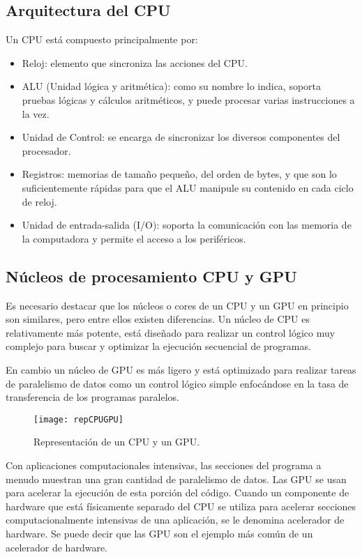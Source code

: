      \subsection{Arquitectura del CPU}

Un CPU está compuesto principalmente por:
\begin{itemize}
\item Reloj: elemento que sincroniza las acciones del CPU.
\item ALU (Unidad lógica y aritmética): como su nombre lo indica, soporta pruebas lógicas y cálculos aritméticos, y puede procesar varias instrucciones a la vez.
\item Unidad de Control: se encarga de sincronizar los diversos componentes del procesador.
\item Registros: memorias de tamaño pequeño, del orden de bytes, y que son lo suficientemente rápidas para que el ALU manipule su contenido en cada ciclo de reloj.
\item Unidad de entrada-salida (I/O): soporta la comunicación con las memoria de la computadora y permite el acceso a los periféricos.
\end{itemize}   

\subsection{Núcleos de procesamiento CPU y GPU}
    Es necesario destacar que los núcleos o cores de un CPU y un GPU en principio son similares, pero entre ellos existen diferencias. Un núcleo de CPU es relativamente más potente, está diseñado para realizar un control lógico muy complejo para buscar y optimizar la ejecución secuencial de programas.
\newline
    
    En cambio un núcleo de GPU es más ligero y está optimizado para realizar tareas de paralelismo de datos como un control lógico simple enfocándose en la tasa de transferencia de los programas paralelos.
 \newline
 
        \begin{figure}[ht]
      \centering
        \texttt{[image: repCPUGPU]}
        \caption{Representación de un CPU y un GPU\cite{NCUDA}.}
        \label{fig:repgpgpu}
    \end{figure}

    Con aplicaciones computacionales intensivas, las secciones del programa a menudo muestran una gran cantidad de paralelismo de datos. Las GPU se usan para acelerar la ejecución de esta porción del código. Cuando un componente de hardware que está físicamente separado del CPU se utiliza para acelerar secciones computacionalmente intensivas de una aplicación, se le denomina acelerador de hardware. Se puede decir que las GPU son el ejemplo más común de un acelerador de hardware.

